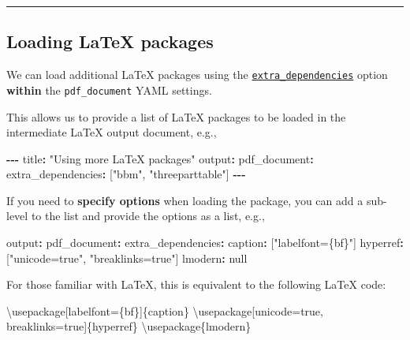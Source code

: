 \documentclass[
]{book}
\newenvironment{Shaded}{\begin{snugshade}}{\end{snugshade}}
\newcommand{\BuiltInTok}[1]{#1}
\newcommand{\ExtensionTok}[1]{#1}
\newcommand{\NormalTok}[1]{#1}
\newcommand{\SpecialCharTok}[1]{\textcolor[rgb]{0.81,0.36,0.00}{\textbf{#1}}}
\newcommand{\StringTok}[1]{\textcolor[rgb]{0.31,0.60,0.02}{#1}}
\theoremstyle{definition}
\theoremstyle{definition}
\theoremstyle{definition}
\theoremstyle{definition}
\theoremstyle{remark}
\begin{document}
\begin{center}\rule{0.5\linewidth}{0.5pt}\end{center}

\subsection*{Loading LaTeX packages}\label{loading-latex-packages}

We can load additional LaTeX packages using the \href{https://bookdown.org/yihui/rmarkdown-cookbook/latex-extra.html}{\texttt{extra\_dependencies}} option {\textbf{within} the \texttt{pdf\_document}} YAML settings.

This allows us to provide a list of LaTeX packages to be loaded in the intermediate LaTeX output document, e.g.,

\begin{Shaded}
\begin{Highlighting}[]
\SpecialCharTok{{-}{-}{-}}
\NormalTok{title}\SpecialCharTok{:} \StringTok{"Using more LaTeX packages"}
\NormalTok{output}\SpecialCharTok{:} 
\NormalTok{  pdf\_document}\SpecialCharTok{:}
\NormalTok{    extra\_dependencies}\SpecialCharTok{:}\NormalTok{ [}\StringTok{"bbm"}\NormalTok{, }\StringTok{"threeparttable"}\NormalTok{]}
\SpecialCharTok{{-}{-}{-}}
\end{Highlighting}
\end{Shaded}

If you need to \textbf{specify options} when loading the package, you can add a sub-level to the list and provide the options as a list, e.g.,

\begin{Shaded}
\begin{Highlighting}[]
\NormalTok{output}\SpecialCharTok{:} 
\NormalTok{  pdf\_document}\SpecialCharTok{:}
\NormalTok{    extra\_dependencies}\SpecialCharTok{:}
\NormalTok{      caption}\SpecialCharTok{:}\NormalTok{ [}\StringTok{"labelfont=\{bf\}"}\NormalTok{]}
\NormalTok{      hyperref}\SpecialCharTok{:}\NormalTok{ [}\StringTok{"unicode=true"}\NormalTok{, }\StringTok{"breaklinks=true"}\NormalTok{]}
\NormalTok{      lmodern}\SpecialCharTok{:}\NormalTok{ null}
\end{Highlighting}
\end{Shaded}

For those familiar with LaTeX, this is equivalent to the following LaTeX code:

\begin{Shaded}
\begin{Highlighting}[]
\BuiltInTok{\textbackslash{}usepackage}\NormalTok{[labelfont=\{bf\}]\{}\ExtensionTok{caption}\NormalTok{\} }
\BuiltInTok{\textbackslash{}usepackage}\NormalTok{[unicode=true, breaklinks=true]\{}\ExtensionTok{hyperref}\NormalTok{\}}
\BuiltInTok{\textbackslash{}usepackage}\NormalTok{\{}\ExtensionTok{lmodern}\NormalTok{\}}
\end{Highlighting}
\end{Shaded}
\end{document}
